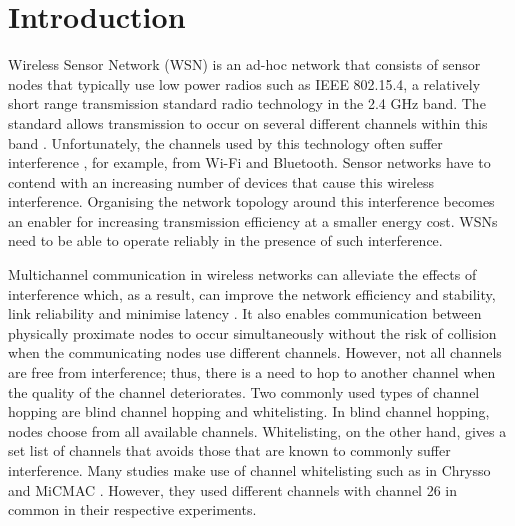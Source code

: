 \section{Introduction}
\label{sec:introduction}
Wireless Sensor Network (WSN) is an ad-hoc network that consists of sensor nodes that typically use low power radios such as IEEE 802.15.4, a relatively short range transmission standard radio technology in the 2.4 GHz band. The standard allows transmission to occur on several different channels within this band \cite{ieee802.15.4}. Unfortunately, the channels used by this technology often suffer interference \cite{Boano:2010:MSM:2127940.2127963, ieeeCompare}, for example, from Wi-Fi \cite{ieee_2012, wu} and Bluetooth. Sensor networks have to contend with an increasing number of devices that cause this wireless interference. Organising the network topology around this interference becomes an enabler for increasing transmission efficiency at a smaller energy cost. WSNs need to be able to operate reliably in the presence of such interference. 

Multichannel communication in wireless networks can alleviate the effects of interference which, as a result, can improve the network efficiency and stability, link reliability and minimise latency \cite{watteyne}. It also enables communication between physically proximate nodes to occur simultaneously without the risk of collision when the communicating nodes use different channels. However, not all channels are free from interference; thus, there is a need to hop to another channel when the quality of the channel deteriorates. Two commonly used types of channel hopping \cite{watteyne} are blind channel hopping and whitelisting. In blind channel hopping, nodes choose from all available channels. 
Whitelisting, on the other hand, gives a set list of channels that avoids those that are known to commonly suffer interference.
Many studies make use of channel whitelisting such as in Chrysso \cite{chrysso} and MiCMAC \cite{micmac}. However, they used different channels with channel 26 in common in their respective experiments. 

